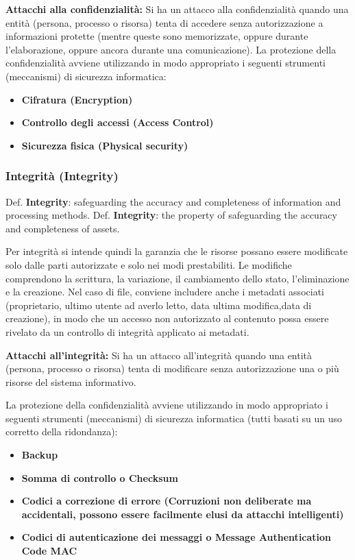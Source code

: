 \textbf{Attacchi alla confidenzialità:} Si ha un attacco alla confidenzialità quando una entità (persona, processo o risorsa) tenta di accedere senza autorizzazione a informazioni protette (mentre queste sono memorizzate, oppure durante l’elaborazione, oppure ancora durante una comunicazione). La protezione della confidenzialità avviene utilizzando in modo appropriato i seguenti strumenti (meccanismi) di sicurezza informatica:
\begin{itemize} 
  \item \textbf{Cifratura (Encryption)}
  \item \textbf{Controllo degli accessi (Access Control)}
  \item \textbf{Sicurezza fisica (Physical security)}
\end{itemize}

\subsubsection{Integrità (Integrity)}
 Def. \textbf{Integrity}: safeguarding the accuracy and completeness of information and processing methods.\newline
 Def. \textbf{Integrity}: the property of safeguarding the accuracy and completeness of assets.\newline


Per integrità si intende quindi la garanzia che le risorse possano essere modificate solo dalle parti autorizzate e solo nei modi prestabiliti. Le modifiche comprendono la scrittura, la variazione, il cambiamento dello stato, l’eliminazione e la creazione. Nel caso di file, conviene includere anche i metadati associati (proprietario, ultimo utente ad averlo letto, data ultima modifica,data di creazione), in modo che un accesso non autorizzato al contenuto possa essere rivelato da un controllo di integrità applicato ai metadati.\newline

\textbf{Attacchi all'integrità:} Si ha un attacco all'integrità quando una entità (persona, processo o risorsa) tenta di modificare senza autorizzazione una o più risorse del sistema informativo.

 La protezione della confidenzialità avviene utilizzando in modo appropriato i seguenti strumenti (meccanismi) di sicurezza informatica (tutti basati su un uso corretto della ridondanza):
\begin{itemize} 
  \item \textbf{Backup}
  \item \textbf{Somma di controllo o Checksum}
  \item \textbf{Codici a correzione di errore (Corruzioni non deliberate ma accidentali, possono essere facilmente elusi da attacchi intelligenti)}
  \item \textbf{Codici di autenticazione dei messaggi o Message Authentication Code MAC} 
\end{itemize}


